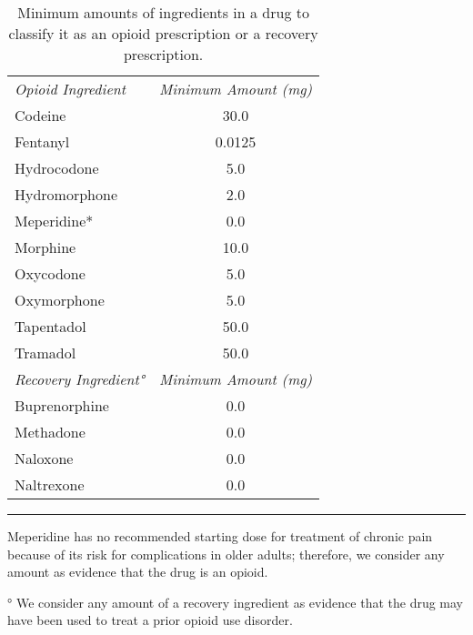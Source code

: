 \documentclass[9pt,twoside]{pnas-new}
\begin{document}
\begin{table}
\caption{Minimum amounts of ingredients in a drug to classify it as an opioid prescription or a recovery prescription.}
\centering
\begin{tabular}{lc}
\em Opioid Ingredient & \em Minimum Amount (mg) \\[0.5em]
Codeine & 30.0 \\
Fentanyl & 0.0125 \\
Hydrocodone & 5.0 \\
Hydromorphone & 2.0 \\
Meperidine* & 0.0 \\
Morphine & 10.0 \\
Oxycodone & 5.0 \\
Oxymorphone & 5.0 \\
Tapentadol & 50.0 \\
Tramadol & 50.0 \\[1em]
\em Recovery Ingredient° & \em Minimum Amount (mg) \\[0.5em]
Buprenorphine & 0.0 \\
Methadone & 0.0 \\
Naloxone & 0.0 \\
Naltrexone & 0.0 \\[1em]
\end{tabular}
\hrule
\begin{tablenotes}
\footnotesize
\item * Meperidine has no recommended starting dose for treatment of chronic pain because of its risk for complications in older adults; therefore, we consider any amount as evidence that the drug is an opioid.
\item ° We consider any amount of a recovery ingredient as evidence that the drug may have been used to treat a prior opioid use disorder.
\end{tablenotes}
\end{table}
\end{document}
